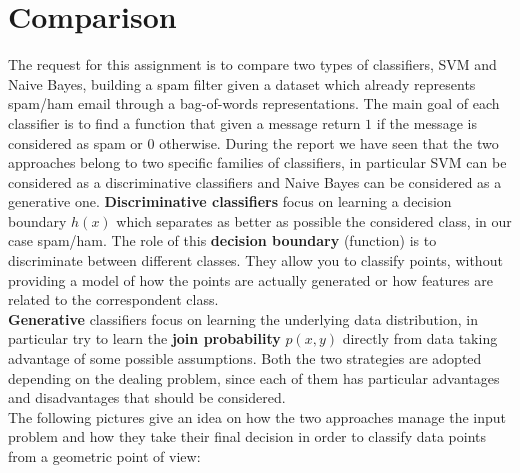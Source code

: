\documentclass[11pt,a4paper]{article}
\begin{document}
\section{Comparison}
The request for this assignment is to compare two types of classifiers, SVM and Naive Bayes, building a spam filter given a dataset which already represents spam/ham email through a bag-of-words representations. The main goal of each classifier is to find a function that given a message return $1$ if the message is considered as spam or $0$ otherwise. During the report we have seen that the two approaches belong to two specific families of classifiers, in particular SVM can be considered as a discriminative classifiers and Naive Bayes can be considered as a generative one.
\textbf{Discriminative classifiers} focus on learning a decision boundary $h(x)$ which separates as better as possible the considered class, in our case spam/ham. The role of this \textbf{decision boundary} (function) is to discriminate between different classes. They allow you to classify points, without providing a model of how the points are actually generated or how features are related to the correspondent class.\\
\textbf{Generative} classifiers focus on learning the underlying data distribution, in particular try to learn the \textbf{join probability} $p(x,y)$ directly from data taking advantage of some possible assumptions. Both the two strategies are adopted depending on the dealing problem, since each of them has particular advantages and disadvantages that should be considered.\\
The following pictures give an idea on how the two approaches manage the input problem and how they take their final decision in order to classify data points from a geometric point of view:
\end{document}
